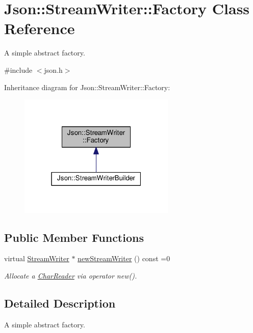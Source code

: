 \hypertarget{class_json_1_1_stream_writer_1_1_factory}{}\section{Json\+:\+:Stream\+Writer\+:\+:Factory Class Reference}
\label{class_json_1_1_stream_writer_1_1_factory}


A simple abstract factory.  




{\ttfamily \#include $<$json.\+h$>$}



Inheritance diagram for Json\+:\+:Stream\+Writer\+:\+:Factory\+:
\nopagebreak
\begin{figure}[H]
\begin{center}
\leavevmode
\includegraphics[width=211pt]{class_json_1_1_stream_writer_1_1_factory__inherit__graph}
\end{center}
\end{figure}
\subsection*{Public Member Functions}
\begin{DoxyCompactItemize}
\item 
virtual \hyperlink{class_json_1_1_stream_writer}{Stream\+Writer} $\ast$ \hyperlink{class_json_1_1_stream_writer_1_1_factory_a9d30ec53e8288cd53befccf1009c5f31}{new\+Stream\+Writer} () const =0
\begin{DoxyCompactList}\small\item\em Allocate a \hyperlink{class_json_1_1_char_reader}{Char\+Reader} via operator new(). \end{DoxyCompactList}\end{DoxyCompactItemize}


\subsection{Detailed Description}
A simple abstract factory. 

